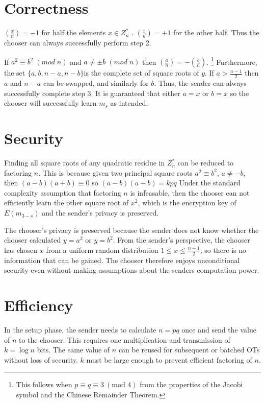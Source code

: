 \section{Correctness}

$\left(\frac{x}{n}\right)=-1$ for half the elements $x\in Z_{n}^{*}$
. $\left(\frac{x}{n}\right)=+1$ for the other half. Thus the chooser
can always successfully perform step 2.

If $a^{2}\equiv b^{2}\;(mod\; n)$ and $a\neq\pm b\;(mod\; n)$ then
$\left(\frac{a}{n}\right)=-\left(\frac{b}{n}\right)$.%
\footnote{This follows when $p\equiv q\equiv3\ (\mbox{mod 4})$ from the properties
of the Jacobi symbol and the Chinese Remainder Theorem.%
} Furthermore, the set $\{a,b,n-a,n-b\}$is the complete set of square
roots of $y$. If $a>\frac{n-1}{2}$ then $a$ and $n-a$ can be swapped,
and similarly for $b$. Thus, the sender can always successfully complete
step 3. It is guaranteed that either $a=x$ or $b=x$ so the chooser
will successfully learn $m_{s}$ as intended.


\section{Security}

Finding all square roots of any quadratic residue in $Z_{n}^{*}$
can be reduced to factoring $n$. This is because given two principal
square roots $a^{2}\equiv b^{2}$, $a\neq-b$, then $(a-b)(a+b)\equiv0$
so $(a-b)(a+b)=kpq$ Under the standard complexity assumption that
factoring $n$ is infeasable, then the chooser can not efficiently
learn the other square root of $x^{2}$, which is the encryption key
of $E(m_{3-s})$ and the sender's privacy is preserved.

The chooser's privacy is preserved because the sender does not know
whether the chooser calculated $y=a^{2}$ or $y=b^{2}$. From the
sender's perspective, the chooser has chosen $x$ from a uniform random
distribution $1\le x\le\frac{n-1}{2}$, so there is no information
that can be gained. The chooser therefore enjoys unconditional security
even without making assumptions about the senders computation power.


\section{Efficiency}

In the setup phase, the sender needs to calculate $n=pq$ once and
send the value of $n$ to the chooser. This requires one multiplication
and transmission of $k=\log n$ bits. The same value of $n$ can be
reused for subsequent or batched OTs without loss of security. $k$
must be large enough to prevent efficient factoring of $n$.

